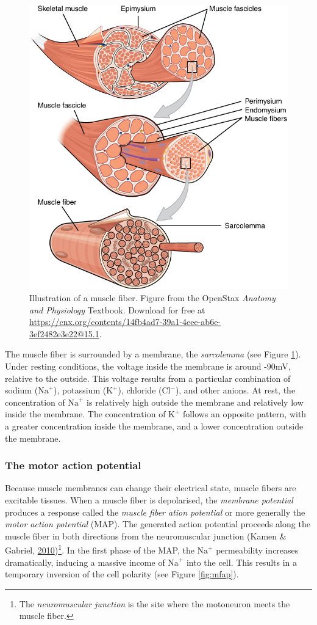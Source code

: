 \documentclass[a4paper,12pt,twoside,openright,oldfontcommands]{memoir}
\let\rmarkdownfootnote\footnote%
\def\footnote{\protect\rmarkdownfootnote}
\begin{document}
\begin{figure}[H]

{\centering \includegraphics[width=0.5\linewidth]{assets/muscle} 

}

\caption{Illustration of a muscle fiber. Figure from the OpenStax \textit{Anatomy and Physiology} Textbook. Download for free at \url{https://cnx.org/contents/14fb4ad7-39a1-4eee-ab6e-3ef2482e3e22@15.1}.}\label{fig:muscle}
\end{figure}

The muscle fiber is surrounded by a membrane, the \emph{sarcolemma} (see Figure \ref{fig:muscle}). Under resting conditions, the voltage inside the membrane is around -90mV, relative to the outside. This voltage results from a particular combination of sodium (\(\text{Na}^{+}\)), potassium (\(\text{K}^{+}\)), chloride (\(\text{Cl}^{-}\)), and other anions. At rest, the concentration of \(\text{Na}^{+}\) is relatively high outside the membrane and relatively low inside the membrane. The concentration of \(\text{K}^{+}\) follows an opposite pattern, with a greater concentration inside the membrane, and a lower concentration outside the membrane.

\hypertarget{the-motor-action-potential}{%
\subsubsection{The motor action potential}\label{the-motor-action-potential}}

Because muscle membranes can change their electrical state, muscle fibers are excitable tissues. When a muscle fiber is depolarised, the \emph{membrane potential} produces a response called the \emph{muscle fiber ation potential} or more generally the \emph{motor action potential} (MAP). The generated action potential proceeds along the muscle fiber in both directions from the neuromuscular junction (Kamen \& Gabriel, \protect\hyperlink{ref-kamen_essentials_2010}{2010})\footnote{The \emph{neuromuscular junction} is the site where the motoneuron meets the muscle fiber.}. In the first phase of the MAP, the \(\text{Na}^{+}\) permeability increases dramatically, inducing a massive income of \(\text{Na}^{+}\) into the cell. This results in a temporary inversion of the cell polarity (see Figure \ref{fig:mfap}).
\end{document}
